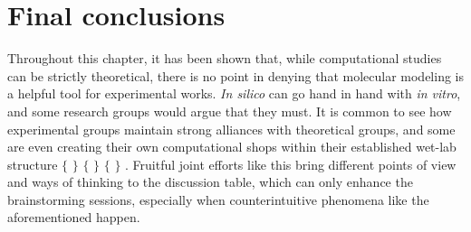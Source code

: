 \section{Final conclusions}
Throughout this chapter, it has been shown that, while computational studies can be strictly theoretical, there is no point in denying that molecular modeling is a helpful tool for experimental works. \textit{In silico} can go hand in hand with \textit{in vitro}, and some research groups would argue that they must. It is common to see how experimental groups maintain strong alliances with theoretical groups, and some are even creating their own computational shops within their established wet-lab structure $ \{ $ $ \} $ $ \{ $ $ \} $ $ \{ $ $ \} $ . Fruitful joint efforts like this bring different points of view and ways of thinking to the discussion table, which can only enhance the brainstorming sessions, especially when counterintuitive phenomena like the aforementioned happen.

